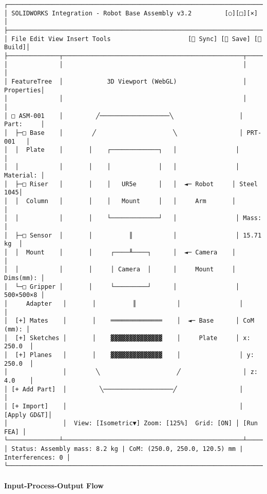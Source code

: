 \documentclass[
]{article}
\begin{document}
\begin{verbatim}
┌────────────────────────────────────────────────────────────────────────────┐
│ SOLIDWORKS Integration - Robot Base Assembly v3.2         [○][□][×]        │
├────────────────────────────────────────────────────────────────────────────┤
│ File Edit View Insert Tools                     [🔄 Sync] [💾 Save] [🔨 Build]│
├──────────────┬─────────────────────────────────────────────────┬───────────┤
│              │                                                 │           │
│ FeatureTree  │            3D Viewport (WebGL)                  │ Properties│
│              │                                                 │           │
│ □ ASM-001    │         ╱───────────────────╲                  │ Part:     │
│  ├─□ Base    │        ╱                     ╲                 │ PRT-001   │
│  │  Plate    │       │    ┌─────────────┐   │                │           │
│  │           │       │    │             │   │                │ Material: │
│  ├─□ Riser   │       │    │   UR5e      │   │  ◄─ Robot     │ Steel 1045│
│  │  Column   │       │    │   Mount     │   │     Arm       │           │
│  │           │       │    └─────────────┘   │                │ Mass:     │
│  ├─□ Sensor  │       │          ║           │                │ 15.71 kg  │
│  │  Mount    │       │     ┌────╨────┐      │  ◄─ Camera    │           │
│  │           │       │     │ Camera  │      │     Mount     │ Dims(mm): │
│  └─□ Gripper │       │     └─────────┘      │                │ 500×500×8 │
│     Adapter   │       │          ║           │                │           │
│  [+] Mates    │       │    ══════════════    │  ◄─ Base      │ CoM (mm): │
│  [+] Sketches │       │    ▓▓▓▓▓▓▓▓▓▓▓▓▓▓    │     Plate     │ x: 250.0  │
│  [+] Planes   │       │    ▓▓▓▓▓▓▓▓▓▓▓▓▓▓    │                │ y: 250.0  │
│               │        ╲                     ╱                 │ z: 4.0    │
│ [+ Add Part]  │         ╲───────────────────╱                 │           │
│ [+ Import]    │                                               │ [Apply GD&T]│
│               │  View: [Isometric▼] Zoom: [125%]  Grid: [ON] │ [Run FEA] │
└──────────────┴─────────────────────────────────────────────────┴───────────┘
│ Status: Assembly mass: 8.2 kg | CoM: (250.0, 250.0, 120.5) mm | Interferences: 0 │
└────────────────────────────────────────────────────────────────────────────┘
\end{verbatim}

\hypertarget{input-process-output-flow}{%
\paragraph{Input-Process-Output Flow}\label{input-process-output-flow}}
\end{document}
